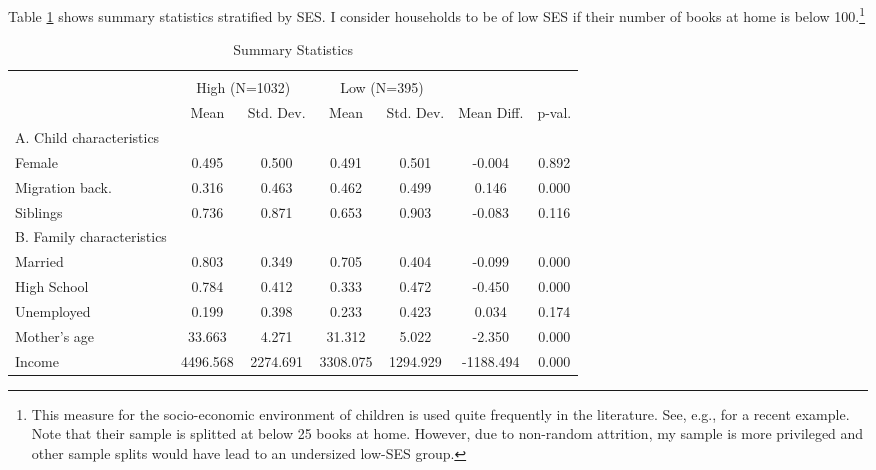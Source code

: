 Table \ref{tab:summ_stats} shows summary statistics stratified by SES. I consider households to be of low SES if their number of books at home is below 100.\footnote{
This measure for the socio-economic environment of children is used quite frequently in the literature. See, e.g., \textcite{resnjanskijCanMentoringAlleviate} for a recent example. Note that their sample is splitted at below 25 books at home. However, due to non-random attrition, my sample is more privileged and other sample splits would have lead to an undersized low-SES group.
}
%
\begin{table}[!htbp]
	\centering
	\begin{threeparttable}
		\caption{Summary Statistics}
		\label{tab:summ_stats}
		\begin{tabular}[t]{lcccccc}
			\hline\hline\\[-1.8ex] 
			\multicolumn{1}{c}{ } & \multicolumn{2}{c}{High (N=1032)} & \multicolumn{2}{c}{Low (N=395)} & \multicolumn{1}{c}{    } & \multicolumn{1}{c}{    } \\
			\cmidrule(l{3pt}r{3pt}){2-3} \cmidrule(l{3pt}r{3pt}){4-5}
			& Mean & Std. Dev. & Mean  & Std. Dev.  & Mean Diff. & p-val.\\
			\midrule
			A. Child characteristics &&&&&&           \\
			\hspace{5mm}Female & 0.495 & 0.500 & 0.491 & 0.501 & -0.004 & 0.892\\
			\hspace{5mm}Migration back. & 0.316 & 0.463 & 0.462 & 0.499 & 0.146 & 0.000\\
			\hspace{5mm}Siblings & 0.736 & 0.871 & 0.653 & 0.903 & -0.083 & 0.116\\
			B. Family characteristics &&&&&&           \\
			\hspace{5mm}Married & 0.803 & 0.349 & 0.705 & 0.404 & -0.099 & 0.000\\
			\hspace{5mm}High School & 0.784 & 0.412 & 0.333 & 0.472 & -0.450 & 0.000\\
			\hspace{5mm}Unemployed & 0.199 & 0.398 & 0.233 & 0.423 & 0.034 & 0.174\\
			\hspace{5mm}Mother's age & 33.663 & 4.271 & 31.312 & 5.022 & -2.350 & 0.000\\
			\hspace{5mm}Income & 4496.568 & 2274.691 & 3308.075 & 1294.929 & -1188.494 & 0.000\\

\end{tabular}
\end{threeparttable}
\end{table}
